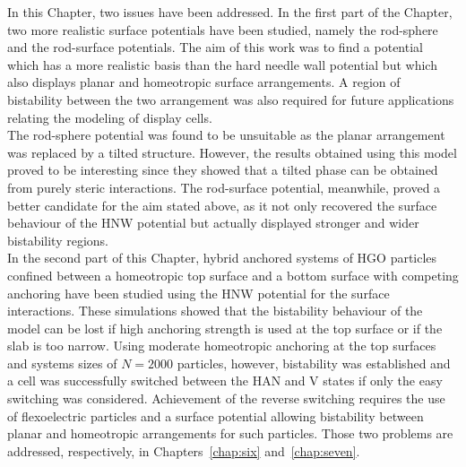 In this Chapter, two issues have been addressed. In the first part of the Chapter, two
more realistic surface potentials have been studied, namely the rod-sphere and the rod-surface
potentials. The aim of this work was to find a potential which has a more realistic basis
than the hard needle wall potential but which also displays planar and homeotropic surface
arrangements. A region of bistability between the two arrangement was also required for future
applications relating the modeling of display cells.\\
The rod-sphere potential was found to be unsuitable as the planar arrangement was replaced by a
tilted structure. However, the results obtained using this model proved to be interesting
since they showed that a tilted phase can be obtained from purely steric interactions. The
rod-surface potential, meanwhile, proved a better candidate for the aim stated above, as it
not only recovered the surface behaviour of the HNW potential but actually displayed stronger
and wider bistability regions.\\
In the second part of this Chapter, hybrid anchored systems of HGO particles confined between a
homeotropic top surface and a bottom surface with competing anchoring have been studied using
the HNW potential for the surface interactions. These simulations showed that the
bistability behaviour of the model can be lost if high anchoring strength is used at the top
surface or if the slab is too narrow. Using moderate homeotropic anchoring at the top surfaces
and systems sizes of $N=2000$ particles, however, bistability was established and a cell
was successfully switched between the HAN and V states if only the easy switching was
considered. Achievement of the reverse switching requires the use of flexoelectric particles and
a surface potential allowing bistability between planar and homeotropic arrangements for such
particles. Those two problems are addressed, respectively, in Chapters~\ref{chap:six}
and~\ref{chap:seven}.






